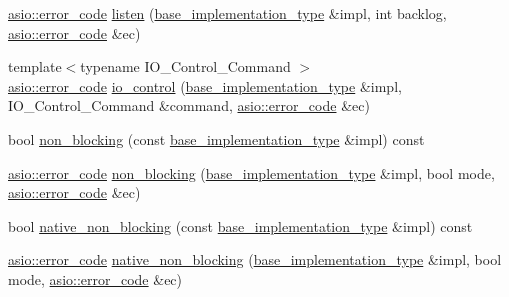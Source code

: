 \begin{DoxyCompactItemize}
\item 
\hyperlink{classasio_1_1error__code}{asio\+::error\+\_\+code} \hyperlink{classasio_1_1detail_1_1reactive__socket__service__base_aea818546babf22661b90c6a37985806c}{listen} (\hyperlink{structasio_1_1detail_1_1reactive__socket__service__base_1_1base__implementation__type}{base\+\_\+implementation\+\_\+type} \&impl, int backlog, \hyperlink{classasio_1_1error__code}{asio\+::error\+\_\+code} \&ec)
\item 
{\footnotesize template$<$typename I\+O\+\_\+\+Control\+\_\+\+Command $>$ }\\\hyperlink{classasio_1_1error__code}{asio\+::error\+\_\+code} \hyperlink{classasio_1_1detail_1_1reactive__socket__service__base_a8427e535d4fece6a925d31c2df9f2ecb}{io\+\_\+control} (\hyperlink{structasio_1_1detail_1_1reactive__socket__service__base_1_1base__implementation__type}{base\+\_\+implementation\+\_\+type} \&impl, I\+O\+\_\+\+Control\+\_\+\+Command \&command, \hyperlink{classasio_1_1error__code}{asio\+::error\+\_\+code} \&ec)
\item 
bool \hyperlink{classasio_1_1detail_1_1reactive__socket__service__base_ae70479d67863203a37c0db50edc9eb6f}{non\+\_\+blocking} (const \hyperlink{structasio_1_1detail_1_1reactive__socket__service__base_1_1base__implementation__type}{base\+\_\+implementation\+\_\+type} \&impl) const 
\item 
\hyperlink{classasio_1_1error__code}{asio\+::error\+\_\+code} \hyperlink{classasio_1_1detail_1_1reactive__socket__service__base_a70d41eca908a74f66d846bc8411b95fb}{non\+\_\+blocking} (\hyperlink{structasio_1_1detail_1_1reactive__socket__service__base_1_1base__implementation__type}{base\+\_\+implementation\+\_\+type} \&impl, bool mode, \hyperlink{classasio_1_1error__code}{asio\+::error\+\_\+code} \&ec)
\item 
bool \hyperlink{classasio_1_1detail_1_1reactive__socket__service__base_a40ec3c4df9ee2553e0103bc943562d82}{native\+\_\+non\+\_\+blocking} (const \hyperlink{structasio_1_1detail_1_1reactive__socket__service__base_1_1base__implementation__type}{base\+\_\+implementation\+\_\+type} \&impl) const 
\item 
\hyperlink{classasio_1_1error__code}{asio\+::error\+\_\+code} \hyperlink{classasio_1_1detail_1_1reactive__socket__service__base_afb8a66f8718231b058cde4594fc1750e}{native\+\_\+non\+\_\+blocking} (\hyperlink{structasio_1_1detail_1_1reactive__socket__service__base_1_1base__implementation__type}{base\+\_\+implementation\+\_\+type} \&impl, bool mode, \hyperlink{classasio_1_1error__code}{asio\+::error\+\_\+code} \&ec)

\end{DoxyCompactItemize}
